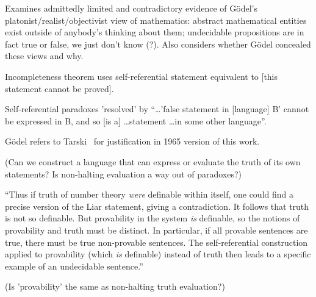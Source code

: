 \label{sec:Godels_life_and_work}

\cite[ch~6 ``G\"{o}del's life and work'']{Feferman1998LightOfLogic}

\label{sec:Kurt_Godel_conviction_and_caution}

Examines admittedly limited and contradictory evidence
of G\"{o}del's platonist/realist/objectivist view of
mathematics: abstract mathematical entities exist outside 
of anybody's thinking about them;
undecidable propositions are in fact true or false, we just don't
know (?).
Also considers whether G\"{o}del concealed these views and 
why.~\cite[ch~7 ``Kurt G\"{o}del: conviction and caution'']{Feferman1998LightOfLogic}

Incompleteness theorem uses self-referential statement
equivalent to [this statement cannot be 
proved].~\cite[p~156]{Feferman1998LightOfLogic}

Self-referential paradoxes 'resolved' by 
``\ldots 'false statement in [language] B' cannot be expressed in
B, and so [is a] \ldots statement \ldots in some other 
language''.~\cite[p~157]{Feferman1998LightOfLogic}

G\"{o}del refers to 
Tarski~\cite{tarski1944semanticTruth,tarski1983logic} 
for justification in 1965 version 
of this work.~\cite{godel1986CollectedI}
 
(Can we construct a language that can express 
or evaluate the truth of 
its own statements? 
Is non-halting evaluation a way out of paradoxes?)

``Thus if truth of number theory \textit{were}
definable within itself, one could find a precise version of the
Liar statement, giving a contradiction.
It follows that truth is not so definable.
But provability in the system \textit{is} definable,
so the notions of provability and truth must be distinct.
In particular, if all provable sentences are true,
there must be true non-provable sentences.
The self-referential construction applied to provability
(which \textit{is} definable) instead of truth then 
leads to a specific example of an undecidable 
sentence.''~\cite[p~159]{Feferman1998LightOfLogic}

(Is 'provability' the same as non-halting truth evaluation?)

